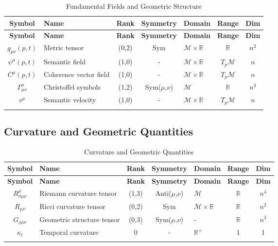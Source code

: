 {\small
\renewcommand{\arraystretch}{1.1}
\begin{longtable}{|c|p{5.5cm}|c|c|p{1.8cm}|c|c|}
\hline
\textbf{Symbol} & \textbf{Name} & \textbf{Rank} & \textbf{Symmetry} & \textbf{Domain} & \textbf{Range} & \textbf{Dim} \\
\hline
\endfirsthead
\hline
\textbf{Symbol} & \textbf{Name} & \textbf{Rank} & \textbf{Symmetry} & \textbf{Domain} & \textbf{Range} & \textbf{Dim} \\
\hline
\endhead
\(g_{\mu\nu}(p,t)\) & Metric tensor & (0,2) & Sym & \(\mathcal{M} \times \mathbb{R}\) & \(\mathbb{R}\) & \(n^2\) \\
\hline
\(\psi^\mu(p,t)\) & Semantic field & (1,0) & - & \(\mathcal{M} \times \mathbb{R}\) & \(T_p\mathcal{M}\) & \(n\) \\
\hline
\(C^\mu(p,t)\) & Coherence vector field & (1,0) & - & \(\mathcal{M} \times \mathbb{R}\) & \(T_p\mathcal{M}\) & \(n\) \\
\hline
\(\Gamma^\rho_{\mu\nu}\) & Christoffel symbols & (1,2) & Sym(\(\mu\),\(\nu\)) & \(\mathcal{M}\) & \(\mathbb{R}\) & \(n^3\) \\
\hline
\(v^\mu\) & Semantic velocity & (1,0) & - & \(\mathcal{M} \times \mathbb{R}\) & \(T_p\mathcal{M}\) & \(n\) \\
\hline
\caption{Fundamental Fields and Geometric Structure}
\end{longtable}
}


\subsection{Curvature and Geometric Quantities}
\label{2.2.2:curvature_and_geometric_quantities}

{\small
\renewcommand{\arraystretch}{1.1}
\begin{longtable}{|c|p{5.5cm}|c|c|p{1.8cm}|c|c|}
\hline
\textbf{Symbol} & \textbf{Name} & \textbf{Rank} & \textbf{Symmetry} & \textbf{Domain} & \textbf{Range} & \textbf{Dim} \\
\hline
\endfirsthead
\hline
\textbf{Symbol} & \textbf{Name} & \textbf{Rank} & \textbf{Symmetry} & \textbf{Domain} & \textbf{Range} & \textbf{Dim} \\
\hline
\endhead
\(R^{\rho}_{\sigma\mu\nu}\) & Riemann curvature tensor & (1,3) & Anti(\(\mu\),\(\nu\)) & \(\mathcal{M}\) & \(\mathbb{R}\) & \(n^4\) \\
\hline
\(R_{\mu\nu}\) & Ricci curvature tensor & (0,2) & Sym & \(\mathcal{M} \times \mathbb{R}\) & \(\mathbb{R}\) & \(n^2\) \\
\hline
\(G_{\rho\mu\nu}\) & Geometric structure tensor & (0,3) & Sym(\(\mu\),\(\nu\)) & - & \(\mathbb{R}\) & \(n^3\) \\
\hline
\(\kappa_t\) & Temporal curvature & 0 & - & \(\mathbb{R}^+\) & 1 & 1 \\
\hline
\caption{Curvature and Geometric Quantities}
\end{longtable}
}

